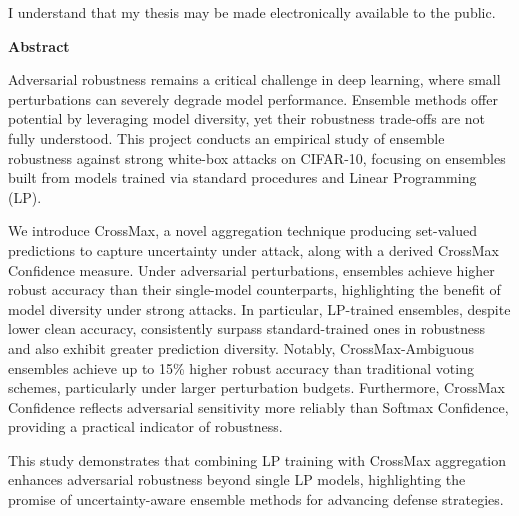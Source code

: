 \documentclass[10pt]{report}
\theoremstyle{definition}
\begin{document}
\noindent I understand that my thesis may be made electronically available to the public.
\clearpage

\newpage

\clearpage


\begin{center}
\textbf{Abstract}
\end{center}

\begin{doublespacing}

\indent

Adversarial robustness remains a critical challenge in deep learning, where small perturbations can severely degrade model performance. Ensemble methods offer potential by leveraging model diversity, yet their robustness trade-offs are not fully understood. This project conducts an empirical study of ensemble robustness against strong white-box attacks on CIFAR-10, focusing on ensembles built from models trained via standard procedures and Linear Programming (LP).

We introduce CrossMax, a novel aggregation technique producing set-valued predictions to capture uncertainty under attack, along with a derived CrossMax Confidence measure. Under adversarial perturbations, ensembles achieve higher robust accuracy than their single-model counterparts, highlighting the benefit of model diversity under strong attacks. In particular, LP-trained ensembles, despite lower clean accuracy, consistently surpass standard-trained ones in robustness and also exhibit greater prediction diversity. Notably, CrossMax-Ambiguous ensembles achieve up to 15\% higher robust accuracy than traditional voting schemes, particularly under larger perturbation budgets. Furthermore, CrossMax Confidence reflects adversarial sensitivity more reliably than Softmax Confidence, providing a practical indicator of robustness.

This study demonstrates that combining LP training with CrossMax aggregation enhances adversarial robustness beyond single LP models, highlighting the promise of uncertainty-aware ensemble methods for advancing defense strategies.

\end{doublespacing}
\clearpage



\tableofcontents

\clearpage


\listoffigures

\clearpage

\listoftables














\end{document}
